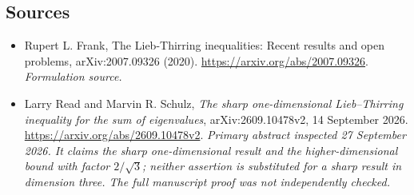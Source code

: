 \documentclass[11pt]{article}
\begin{document}
\subsection{Sources}
\begin{itemize}
\item[S1]Rupert L. Frank, The Lieb-Thirring inequalities: Recent results and open problems, arXiv:2007.09326 (2020).
\url{https://arxiv.org/abs/2007.09326}.
\textit{Formulation source.}
\item[E1]Larry Read and Marvin R. Schulz, \emph{The sharp one-dimensional
Lieb--Thirring inequality for the sum of eigenvalues},
arXiv:2609.10478v2, 14 September 2026.
\url{https://arxiv.org/abs/2609.10478v2}.
\textit{Primary abstract inspected 27 September 2026. It claims the sharp
one-dimensional result and the higher-dimensional bound with factor
$2/\sqrt3$; neither assertion is substituted for a sharp result in
dimension three. The full manuscript proof was not independently checked.}
\end{itemize}
\end{document}
